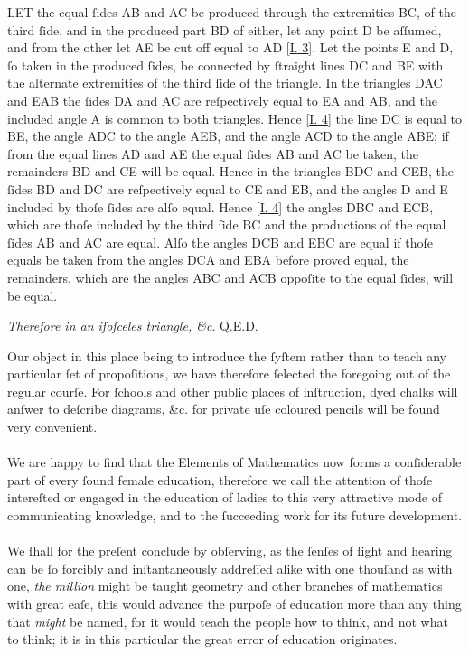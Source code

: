 L\textsc{ET} the equal ſides AB and AC be produced through the extremities BC, of the third ſide, and in the produced part BD of either, let any point D be aſſumed, and from the other let AE be cut off equal to AD [\hyperref[book1pr3]{\textsc{I.} 3}]. Let the points E and D, ſo taken in the produced ſides, be connected by ſtraight lines DC and BE with the alternate extremities of the third ſide of the triangle.  In the triangles DAC and EAB the ſides DA and AC are reſpectively equal to EA and AB, and the included angle A is common to both triangles. Hence [\hyperref[book1pr4]{\textsc{I.} 4}] the line DC is equal to BE, the angle ADC to the angle AEB, and the angle ACD to the angle ABE; if from the equal lines AD and AE the equal ſides AB and AC be taken, the remainders BD and CE will be equal. Hence in the triangles BDC and CEB, the ſides BD and DC are reſpectively equal to CE and EB, and the angles D and E included by thoſe ſides are alſo equal. Hence [\hyperref[book1pr4]{\textsc{I.} 4}] the angles DBC and ECB, which are thoſe included by the third ſide BC and the productions of the equal ſides AB and AC are equal.  Alſo the angles DCB and EBC are equal if thoſe equals be taken from the angles DCA and EBA before proved equal, the remainders, which are the angles ABC and ACB oppoſite to the equal ſides, will be equal.

\begin{center}
    \textit{Therefore in an iſoſceles triangle, \&c}. \hfill Q.E.D.
\end{center}

Our object in this place being to introduce the ſyſtem rather than to teach any particular ſet of propoſitions, we have therefore ſelected the foregoing out of the regular courſe. For ſchools and other public places of inſtruction, dyed chalks will anſwer to deſcribe diagrams, \&c. for private uſe coloured pencils will be found very convenient.\\
\hfill\\
We are happy to find that the Elements of Mathematics now forms a conſiderable part of every ſound female education, therefore we call the attention of thoſe intereſted or engaged in the education of ladies to this very attractive mode of communicating knowledge, and to the ſucceeding work for its future development.\\
\hfill\\
We ſhall for the preſent conclude by obſerving, as the ſenſes of ſight and hearing can be ſo forcibly and inſtantaneously addreſſed alike with one thouſand as with one, \textit{the million} might be taught geometry and other branches of mathematics with great eaſe, this would advance the purpoſe of education more than any thing that \textit{might} be named, for it would teach the people how to think, and not what to think; it is in this particular the great error of education originates.